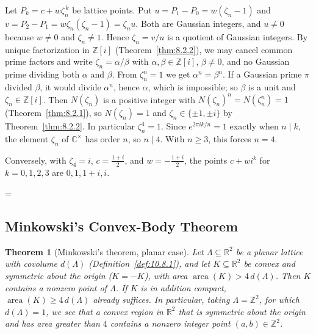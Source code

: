 \documentclass[11pt]{article}
\makeatletter
\theoremstyle{ntstyle}
\newtheorem{theorem}{Theorem}[subsection]
\let\nt@closedisplay\]
\def\nt@guardedclose{\@ifnextchar\par{\nt@closeafterpar}{\@ifnextchar\end{\postdisplaypenalty\@M\nt@closedisplay}{\nt@closedisplay}}}
\def\nt@closeafterpar\par{\@ifnextchar\par{\nt@closeafterpar}{\@ifnextchar\end{\postdisplaypenalty\@M\nt@closedisplay\par}{\nt@closedisplay\par}}}
\renewenvironment{proof}[1][\proofname]{\par
  \pushQED{\qed}\normalfont\topsep\medskipamount\edef\nt@afterproof{\@endparpenalty=\the\@endparpenalty\relax}\@beginparpenalty\@M\@endparpenalty\@M\let\]\nt@guardedclose\trivlist\item[]\textit{#1\@addpunct{.}} \ignorespaces}{\ifvmode\addpenalty\@M\fi\popQED\nt@afterproof\endtrivlist\@endpefalse}
\DeclareMathOperator{\area}{area}
\makeatother
\begin{document}
\begin{proof} Let $P_k=c+w\zeta_n^{\,k}$ be lattice points. Put
	$u=P_1-P_0=w(\zeta_n-1)$ and $v=P_2-P_1=w\zeta_n(\zeta_n-1)=\zeta_n u$. Both
	are Gaussian integers, and $u\neq0$ because $w\neq0$ and $\zeta_n\neq1$.
	Hence $\zeta_n=v/u$ is a quotient of Gaussian integers. By unique
	factorization in $\mathbb{Z}[i]$ (Theorem~\ref{thm:8.2.2}), we may cancel
	common prime factors and write $\zeta_n=\alpha/\beta$ with
	$\alpha,\beta\in\mathbb{Z}[i]$, $\beta\neq0$, and no Gaussian prime dividing
	both $\alpha$ and $\beta$. From $\zeta_n^n=1$ we get $\alpha^n=\beta^n$. If a
	Gaussian prime $\pi$ divided $\beta$, it would divide $\alpha^n$, hence
	$\alpha$, which is impossible; so $\beta$ is a unit and
	$\zeta_n\in\mathbb{Z}[i]$. Then $N(\zeta_n)$ is a positive integer with
	$N(\zeta_n)^n=N(\zeta_n^n)=1$ (Theorem~\ref{thm:8.2.1}), so $N(\zeta_n)=1$
	and $\zeta_n\in\{\pm1,\pm i\}$ by Theorem~\ref{thm:8.2.2}. In particular
	$\zeta_n^4=1$. Since $e^{2\pi ik/n}=1$ exactly when $n\mid k$, the element
	$\zeta_n$ of $\mathbb{C}^{\times}$ has order $n$, so $n\mid4$. With $n\ge3$,
	this forces $n=4$.

	Conversely, with $\zeta_4=i$, $c=\frac{1+i}{2}$, and $w=-\frac{1+i}{2}$, the
	points $c+wi^k$ for $k=0,1,2,3$ are $0,1,1+i,i$.

\end{proof}
\subsection{Minkowski's Convex-Body Theorem}

\begin{theorem}[Minkowski's theorem, planar case]\label{thm:10.11.1} Let
	$\Lambda\subseteq\mathbb{R}^2$ be a planar lattice with covolume
	$d(\Lambda)$ (Definition~\ref{def:10.8.1}), and let $K\subseteq\mathbb{R}^2$
	be convex and symmetric about the origin ($K=-K$), with area
	$\area(K)>4\,d(\Lambda)$. Then $K$ contains a nonzero
	point of $\Lambda$. If $K$ is in addition compact,
	$\area(K)\ge 4\,d(\Lambda)$ already suffices. In particular, taking
	$\Lambda=\mathbb{Z}^2$, for which $d(\Lambda)=1$, we see that a convex region in
	$\mathbb{R}^2$ that is symmetric about the origin and has area greater than $4$
	contains a nonzero integer point $(a,b)\in\mathbb{Z}^2$.

\end{theorem}
\end{document}
